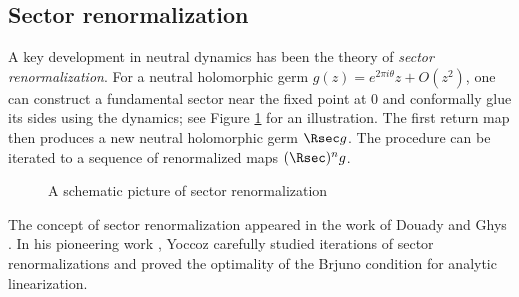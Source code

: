 \documentclass{amsart}
\begin{document}
\subsection{Sector renormalization}\label{ss:SectRenorm}

A key development in neutral dynamics
has been the theory of \emph{sector renormalization}.
For a neutral holomorphic germ $g(z) = e^{2\pi i \theta}z + O(z^2)$, one can construct a fundamental sector near the fixed
point at 0 and conformally glue its sides using the dynamics; see Figure \ref{fig:sector-renormalization-local} for an
illustration.
The first return map then produces a new neutral holomorphic germ $\Rsec g$. 
The procedure can be iterated to a sequence of renormalized maps $(\Rsec)^n g$.

\begin{figure}
    \centering
    \caption{A schematic picture of sector renormalization}
    \label{fig:sector-renormalization-local}
\end{figure}

The concept 
of sector renormalization appeared in the work of Douady and Ghys \cite{D87}. 
In his pioneering work \cite{Yoc95}, Yoccoz carefully studied iterations of sector renormalizations and proved the optimality of the Brjuno condition for analytic linearization.
\end{document}
